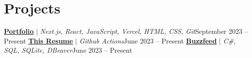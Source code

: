 
\section{Projects}

\resumeSubHeadingListStart
\resumeProjectHeading
{\textbf{\href{https://jaychen.app}{\underline{Portfolio}}} $|$ \emph{Next.js, React, JavaScript, Vercel, HTML, CSS, Git}}{September 2023 -- Present}
\resumeItemListStart
{}
\resumeItemListEnd
\resumeProjectHeading
{\textbf{\href{https://github.com/jundachen10/jays_resume}{\underline{This Resume}}} $|$ \emph{Github Actions}}{June 2023 -- Present}
\resumeItemListStart
{}
\resumeItemListEnd
\resumeProjectHeading
{\textbf{\href{https://github.com/jundachen10/buzzfeed}{\underline{Buzzfeed}}} $|$ \emph{C\#, SQL, SQLite, DBeaver}}{June 2023 -- Present}
\resumeItemListStart
{}
\resumeItemListEnd
\resumeSubHeadingListEnd